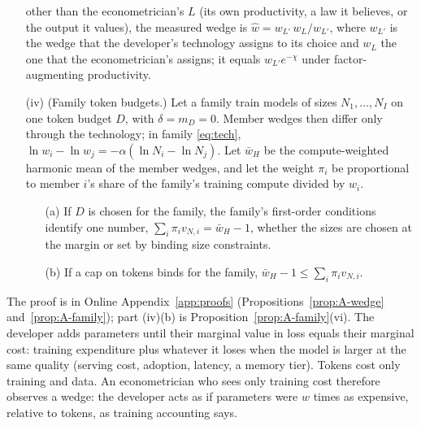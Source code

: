 \begin{proposition}
\begin{enumerate}
other than the econometrician's $L$ (its own productivity, a law it believes, or the output it values), the measured
wedge is $\hat w=w_{L'}\,w_L/w_{L'}$, where $w_{L'}$ is the wedge that the developer's technology assigns to its choice
and $w_L$ the one that the econometrician's assigns; it equals $w_{L'}e^{-\chi}$ under factor-augmenting productivity.
\item[(iv)] (Family token budgets.) Let a family train models of sizes $N_1,\dots,N_I$ on one token budget $D$, with
$\delta=m_D=0$. Member wedges then differ only through the technology; in family \eqref{eq:tech},
$\ln w_i-\ln w_j=-\alpha(\ln N_i-\ln N_j)$. Let $\bar w_H$ be the compute-weighted harmonic mean of the member wedges,
and let the weight $\pi_i$ be proportional to member $i$'s share of the family's training compute divided by $w_i$.
\begin{enumerate}
\item[(a)] If $D$ is chosen for the family, the family's first-order conditions identify one number,
$\sum_i\pi_iv_{N,i}=\bar w_H-1$, whether the sizes are chosen at the margin or set by binding size constraints.
\item[(b)] If a cap on tokens binds for the family, $\bar w_H-1\le\sum_i\pi_iv_{N,i}$.
\end{enumerate}
\end{enumerate}
\end{proposition}

\noindent The proof is in Online Appendix~\ref{app:proofs} (Propositions~\ref{prop:A-wedge} and~\ref{prop:A-family});
part (iv)(b) is Proposition~\ref{prop:A-family}(vi). The developer adds parameters
until their marginal value in loss equals their marginal cost: training expenditure plus whatever it loses when the model
is larger at the same quality (serving cost, adoption, latency, a memory tier). Tokens cost only training and data. An econometrician who sees only training cost therefore observes a
wedge: the developer acts as if parameters were $w$ times as expensive, relative to tokens, as training accounting says.

